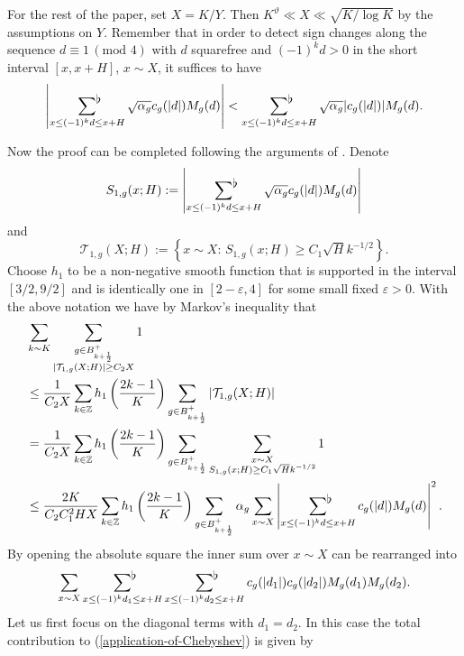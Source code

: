 \documentclass[a4paper,10pt,twoside]{amsart}
\theoremstyle{definition}
\numberwithin{equation}{section}
\newcommand\Z{\mathbb{Z}}
\newcommand\eps{\varepsilon}
\renewcommand\:{\colon}
\newcommand{\sumflat}{\mathop{{\sum}^{\raisebox{-3pt}{\makebox[0pt][l]{$\flat$}}}}}
\begin{document}
For the rest of the paper, set $X=K/Y$. Then $K^\vartheta\ll X\ll\sqrt{K/\log K}$ by the assumptions on $Y$. Remember that in order to detect sign changes along the sequence $d\equiv 1\,(\text{mod }4)$ with $d$ squarefree and $(-1)^kd>0$ in the short interval $[x,x+H]$, $x\sim X$, it suffices to have
\[
\left|\sumflat_{x\leq (-1)^kd\leq x+H}\sqrt{\alpha_g}c_g(|d|)M_g(d)\right|<\sumflat_{x\leq (-1)^kd\leq x+H}\sqrt{\alpha_g}|c_g(|d|)|M_g(d).
\]

Now the proof can be completed following the arguments of \cite{Jaasaari2026}. Denote
\[S_{1,g}(x;H):=\left|\sumflat_{x\leq (-1)^kd\leq x+H}\sqrt{\alpha_g}c_g(|d|)M_g(d)\right|\]
and 
\[\mathcal T_{1,g}(X;H):=\left\{x\sim X:\,S_{1,g}(x;H)\geq C_1\sqrt H k^{-1/2}\right\}.\]
Choose $h_1$ to be a non-negative smooth function that is supported in the interval $[3/2,9/2]$ and is identically one in $[2-\eps,4]$ for some small fixed $\eps>0$. With the above notation we have by Markov's inequality that
\begin{align}\label{application-of-Chebyshev}
&\sum_{k\sim K}\sum_{\substack{g\in B_{k+\frac12}^+\\|\mathcal T_{1,g}(X;H)|\geq C_2 X}} 1 \nonumber\\
&\leq\frac{1}{C_2X}\sum_{k\in\Z}h_1\left(\frac{2k-1}K\right)\sum_{g\in B_{k+\frac12}^+}|\mathcal T_{1,g}(X;H)| \nonumber\\
&=\frac{1}{C_2X}\sum_{k\in\Z}h_1\left(\frac{2k-1}K\right)\sum_{g\in B_{k+\frac12}^+}\sum_{\substack{x\sim X\\
S_{1,g}(x;H)\geq C_1 \sqrt H k^{-1/2}}}1 \nonumber \\
&\leq \frac {2K}{C_2C_1^2HX}\sum_{k\in\Z}h_1\left(\frac{2k-1}K\right)\sum_{g\in B_{k+\frac12}^+}\alpha_g\sum_{x\sim X}\left|\sumflat_{x\leq (-1)^kd\leq x+H}c_g(|d|)M_g(d)\right|^2. 
\end{align}
By opening the absolute square the inner sum over $x\sim X$ can be rearranged into
\[ 
\sum_{x\sim X}\sumflat_{x\leq(-1)^kd_1\leq x+H}\sumflat_{x\leq(-1)^kd_2\leq x+H}c_g(|d_1|)c_g(|d_2|)M_g(d_1)M_g(d_2).\]
Let us first focus on the diagonal terms with $d_1=d_2$. In this case the total contribution to (\ref{application-of-Chebyshev}) is given by
\end{document}

